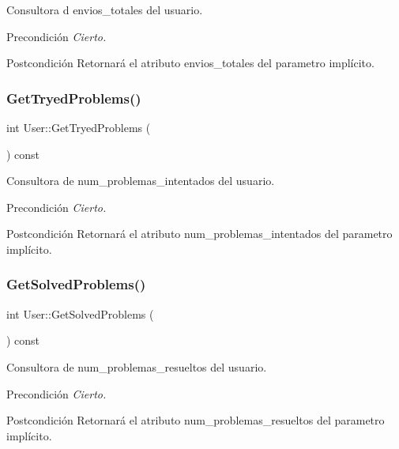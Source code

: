 Consultora d envios\+\_\+totales del usuario. 

\begin{DoxyPrecond}{Precondición}
{\itshape Cierto.} 
\end{DoxyPrecond}
\begin{DoxyPostcond}{Postcondición}
Retornará el atributo envios\+\_\+totales del parametro implícito. 
\end{DoxyPostcond}
\mbox{\label{class_user_a8c4799a9a4bfa78fbe289f845deaccb1}} 
\subsubsection{\texorpdfstring{Get\+Tryed\+Problems()}{GetTryedProblems()}}
{\footnotesize\ttfamily int User\+::\+Get\+Tryed\+Problems (\begin{DoxyParamCaption}{ }\end{DoxyParamCaption}) const}



Consultora de num\+\_\+problemas\+\_\+intentados del usuario. 

\begin{DoxyPrecond}{Precondición}
{\itshape Cierto.} 
\end{DoxyPrecond}
\begin{DoxyPostcond}{Postcondición}
Retornará el atributo num\+\_\+problemas\+\_\+intentados del parametro implícito. 
\end{DoxyPostcond}
\mbox{\label{class_user_a4dc2fc233119ddda449099634f4d2c46}} 
\subsubsection{\texorpdfstring{Get\+Solved\+Problems()}{GetSolvedProblems()}}
{\footnotesize\ttfamily int User\+::\+Get\+Solved\+Problems (\begin{DoxyParamCaption}{ }\end{DoxyParamCaption}) const}



Consultora de num\+\_\+problemas\+\_\+resueltos del usuario. 

\begin{DoxyPrecond}{Precondición}
{\itshape Cierto.} 
\end{DoxyPrecond}
\begin{DoxyPostcond}{Postcondición}
Retornará el atributo num\+\_\+problemas\+\_\+resueltos del parametro implícito. 
\end{DoxyPostcond}
\mbox{\label{class_user_a53b7e71fae56e308549a5773c66011f9}} 
